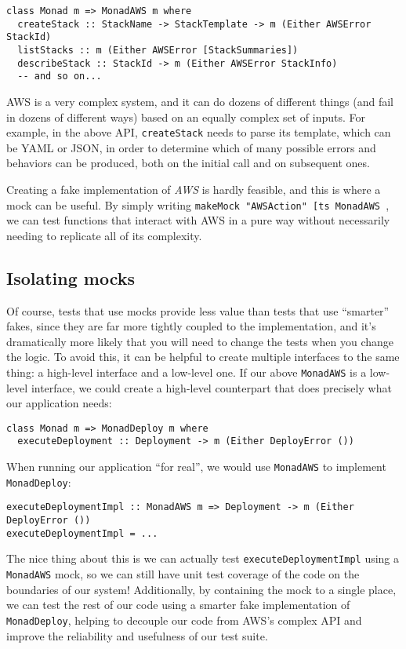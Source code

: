 \begin{verbatim}
class Monad m => MonadAWS m where
  createStack :: StackName -> StackTemplate -> m (Either AWSError StackId)
  listStacks :: m (Either AWSError [StackSummaries])
  describeStack :: StackId -> m (Either AWSError StackInfo)
  -- and so on...
\end{verbatim}
AWS is a very complex system, and it can do dozens of different things
(and fail in dozens of different ways) based on an equally complex set
of inputs. For example, in the above API, \texttt{createStack} needs to
parse its template, which can be YAML or JSON, in order to determine
which of many possible errors and behaviors can be produced, both on the
initial call and on subsequent ones.

Creating a fake implementation of \emph{AWS} is hardly feasible, and
this is where a mock can be useful. By simply writing
\texttt{makeMock\ "AWSAction"\ {[}ts\textbar{}\ MonadAWS\ \textbar{}{]}},
we can test functions that interact with AWS in a pure way without
necessarily needing to replicate all of its complexity.

\hypertarget{isolating-mocks}{%
\subsection{Isolating mocks}\label{isolating-mocks}}

Of course, tests that use mocks provide less value than tests that use
``smarter'' fakes, since they are far more tightly coupled to the
implementation, and it's dramatically more likely that you will need to
change the tests when you change the logic. To avoid this, it can be
helpful to create multiple interfaces to the same thing: a high-level
interface and a low-level one. If our above \texttt{MonadAWS} is a
low-level interface, we could create a high-level counterpart that does
precisely what our application needs:

\begin{verbatim}
class Monad m => MonadDeploy m where
  executeDeployment :: Deployment -> m (Either DeployError ())
\end{verbatim}
When running our application ``for real'', we would use
\texttt{MonadAWS} to implement \texttt{MonadDeploy}:

\begin{verbatim}
executeDeploymentImpl :: MonadAWS m => Deployment -> m (Either DeployError ())
executeDeploymentImpl = ...
\end{verbatim}
The nice thing about this is we can actually test
\texttt{executeDeploymentImpl} using a \texttt{MonadAWS} mock, so we can
still have unit test coverage of the code on the boundaries of our
system! Additionally, by containing the mock to a single place, we can
test the rest of our code using a smarter fake implementation of
\texttt{MonadDeploy}, helping to decouple our code from AWS's complex
API and improve the reliability and usefulness of our test suite.

